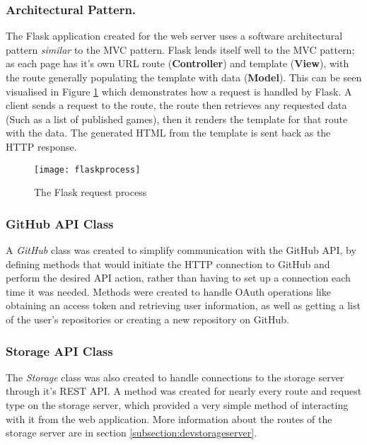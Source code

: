 	\subsubsection{Architectural Pattern.}
	The Flask application created for the web server uses a software architectural pattern \emph{similar} to the MVC pattern. Flask lends itself well to the MVC pattern; as each page has it's own URL route (\textbf{Controller}) and template (\textbf{View}), with the route generally populating the template with data (\textbf{Model}). This can be seen visualised in Figure \ref{fig:flaskprocess} which demonstrates how a request is handled by Flask. A client sends a request to the route, the route then retrieves any requested data (Such as a list of published games), then it renders the template for that route with the data. The generated HTML from the template is sent back as the HTTP response.

	\begin{figure}[h]
		\centering
		\texttt{[image: flaskprocess]}
		\caption{The Flask request process}
		\label{fig:flaskprocess}
	\end{figure}

	\subsubsection{GitHub API Class}
	A \emph{GitHub} class was created to simplify communication with the GitHub API, by defining methods that would initiate the HTTP connection to GitHub and perform the desired API action, rather than having to set up a connection each time it was needed. Methods were created to handle OAuth operations like obtaining an access token and retrieving user information, as well as getting a list of the user's repositories or creating a new repository on GitHub.

	\subsubsection{Storage API Class}
	The \emph{Storage} class was also created to handle connections to the storage server through it's REST API. A method was created for nearly every route and request type on the storage server, which provided a very simple method of interacting with it from the web application. More information about the routes of the storage server are in section \ref{subsection:devstorageserver}.

